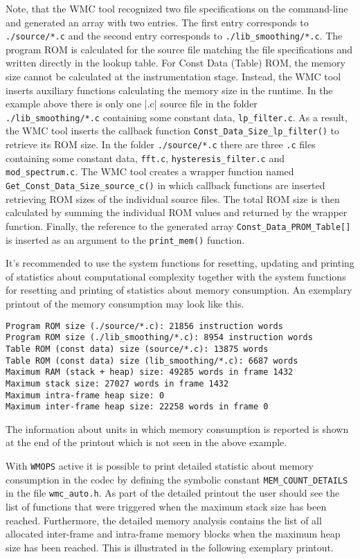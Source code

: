 Note, that the WMC tool recognized two file specifications on the command-line and generated an array with two entries. The first entry corresponds to \verb|./source/*.c| and the second entry corresponds to \verb|./lib_smoothing/*.c|. The program ROM is calculated for the source file matching the file specifications and written directly in the lookup table. For Const Data (Table) ROM, the memory size cannot be calculated at the instrumentation stage. Instead, the WMC tool inserts auxiliary functions calculating the memory size in the runtime. In the example above there is only one |.c| source file in the folder \verb|./lib_smoothing/*.c| containing some constant data, \verb|lp_filter.c|. As a result, the WMC tool inserts the callback function \verb|Const_Data_Size_lp_filter()| to retrieve its ROM size. In the folder \verb|./source/*.c| there are three \verb|.c| files containing some constant data, \verb|fft.c|, \verb|hysteresis_filter.c| and \verb|mod_spectrum.c|. The WMC tool creates a wrapper function named \verb|Get_Const_Data_Size_source_c()| in which callback functions are inserted retrieving ROM sizes of the individual source files. The total ROM size is then calculated by summing the individual ROM values and returned by the wrapper function. Finally, the reference to the generated array \verb|Const_Data_PROM_Table[]| is inserted as an argument to the \verb|print_mem()| function. 

It's recommended to use the system functions for resetting, updating and printing of statistics about computational complexity together with the system functions for resetting and printing of statistics about memory consumption. An exemplary printout of the memory consumption may look like this. 

\begin{Verbatim}[fontsize=\small]
Program ROM size (./source/*.c): 21856 instruction words
Program ROM size (./lib_smoothing/*.c): 8954 instruction words
Table ROM (const data) size (source/*.c): 13875 words
Table ROM (const data) size (lib_smoothing/*.c): 6687 words
Maximum RAM (stack + heap) size: 49285 words in frame 1432
Maximum stack size: 27027 words in frame 1432
Maximum intra-frame heap size: 0
Maximum inter-frame heap size: 22258 words in frame 0
\end{Verbatim}

The information about units in which memory consumption is reported is shown at the end of the printout which is not seen in the above example.

With \verb|WMOPS| active it is possible to print detailed statistic about memory consumption in the codec by defining the symbolic constant \verb|MEM_COUNT_DETAILS| in the file \verb|wmc_auto.h|. As part of the detailed printout the user should see the list of functions that were triggered when the maximum stack size has been reached. Furthermore, the detailed memory analysis contains the list of all allocated inter-frame and intra-frame memory blocks when the maximum heap size has been reached. This is illustrated in the following exemplary printout.

